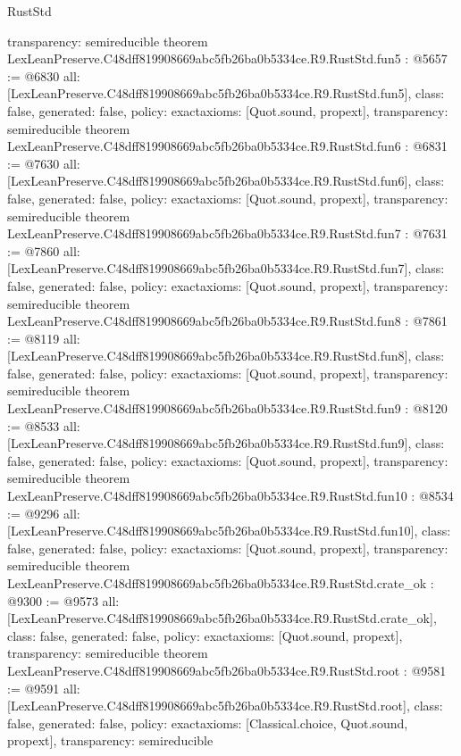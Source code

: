 \begin{lexlean}{RustStd}
\begin{coremodule}
{  transparency: semireducible
}
theorem LexLeanPreserve.C48dff819908669abc5fb26ba0b5334ce.R9.RustStd.fun5 : @5657 := @6830 {
  all: [LexLeanPreserve.C48dff819908669abc5fb26ba0b5334ce.R9.RustStd.fun5],
  class: false,
  generated: false,
  policy: exact{axioms: [Quot.sound, propext]},
  transparency: semireducible
}
theorem LexLeanPreserve.C48dff819908669abc5fb26ba0b5334ce.R9.RustStd.fun6 : @6831 := @7630 {
  all: [LexLeanPreserve.C48dff819908669abc5fb26ba0b5334ce.R9.RustStd.fun6],
  class: false,
  generated: false,
  policy: exact{axioms: [Quot.sound, propext]},
  transparency: semireducible
}
theorem LexLeanPreserve.C48dff819908669abc5fb26ba0b5334ce.R9.RustStd.fun7 : @7631 := @7860 {
  all: [LexLeanPreserve.C48dff819908669abc5fb26ba0b5334ce.R9.RustStd.fun7],
  class: false,
  generated: false,
  policy: exact{axioms: [Quot.sound, propext]},
  transparency: semireducible
}
theorem LexLeanPreserve.C48dff819908669abc5fb26ba0b5334ce.R9.RustStd.fun8 : @7861 := @8119 {
  all: [LexLeanPreserve.C48dff819908669abc5fb26ba0b5334ce.R9.RustStd.fun8],
  class: false,
  generated: false,
  policy: exact{axioms: [Quot.sound, propext]},
  transparency: semireducible
}
theorem LexLeanPreserve.C48dff819908669abc5fb26ba0b5334ce.R9.RustStd.fun9 : @8120 := @8533 {
  all: [LexLeanPreserve.C48dff819908669abc5fb26ba0b5334ce.R9.RustStd.fun9],
  class: false,
  generated: false,
  policy: exact{axioms: [Quot.sound, propext]},
  transparency: semireducible
}
theorem LexLeanPreserve.C48dff819908669abc5fb26ba0b5334ce.R9.RustStd.fun10 : @8534 := @9296 {
  all: [LexLeanPreserve.C48dff819908669abc5fb26ba0b5334ce.R9.RustStd.fun10],
  class: false,
  generated: false,
  policy: exact{axioms: [Quot.sound, propext]},
  transparency: semireducible
}
theorem LexLeanPreserve.C48dff819908669abc5fb26ba0b5334ce.R9.RustStd.crate_ok : @9300 := @9573 {
  all: [LexLeanPreserve.C48dff819908669abc5fb26ba0b5334ce.R9.RustStd.crate_ok],
  class: false,
  generated: false,
  policy: exact{axioms: [Quot.sound, propext]},
  transparency: semireducible
}
theorem LexLeanPreserve.C48dff819908669abc5fb26ba0b5334ce.R9.RustStd.root : @9581 := @9591 {
  all: [LexLeanPreserve.C48dff819908669abc5fb26ba0b5334ce.R9.RustStd.root],
  class: false,
  generated: false,
  policy: exact{axioms: [Classical.choice, Quot.sound, propext]},
  transparency: semireducible
}


\end{coremodule}
\end{lexlean}
